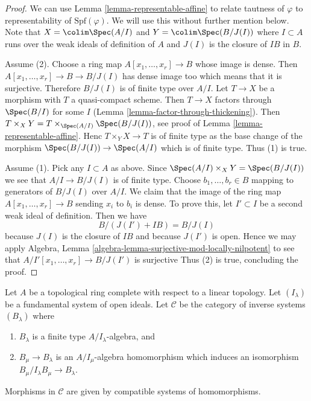 \begin{proof}
We can use Lemma \ref{lemma-representable-affine}
to relate tautness of $\varphi$ to representability of
$\text{Spf}(\varphi)$. We will use this without further mention below.
Note that $X = \colim \Spec(A/I)$ and $Y = \colim \Spec(B/J(I))$
where $I \subset A$ runs over the weak ideals of definition of $A$
and $J(I)$ is the closure of $IB$ in $B$.

\medskip\noindent
Assume (2).
Choose a ring map $A[x_1, \ldots, x_r] \to B$ whose image is dense.
Then $A[x_1, \ldots, x_r] \to B \to B/J(I)$ has dense image too
which means that it is surjective. Therefore $B/J(I)$ is of
finite type over $A/I$. Let $T \to X$ be a morphism with
$T$ a quasi-compact scheme. Then $T \to X$ factors through
$\Spec(B/I)$ for some $I$ (Lemma \ref{lemma-factor-through-thickening}).
Then $T \times_X Y = T \times_{\Spec(A/I)} \Spec(B/J(I))$, see proof of
Lemma \ref{lemma-representable-affine}.
Henc $T \times_Y X \to T$ is of finite type as the base change of
the morphism $\Spec(B/J(I)) \to \Spec(A/I)$ which is of finite
type. Thus (1) is true.

\medskip\noindent
Assume (1). Pick any $I \subset A$ as above. Since
$\Spec(A/I) \times_X Y = \Spec(B/J(I))$ we see that $A/I \to B/J(I)$
is of finite type. Choose $b_1, \ldots, b_r \in B$
mapping to generators of $B/J(I)$ over $A/I$. We claim that the image
of the ring map $A[x_1, \ldots, x_r] \to B$ sending $x_i$ to $b_i$
is dense. To prove this, let $I' \subset I$ be a second weak ideal
of definition. Then we have
$$
B/(J(I') + IB) = B/J(I)
$$
because $J(I)$ is the closure of $IB$ and because $J(I')$ is open.
Hence we may apply Algebra, Lemma
\ref{algebra-lemma-surjective-mod-locally-nilpotent}
to see that $A/I'[x_1, \ldots, x_r] \to B/J(I')$ is surjective
Thus (2) is true, concluding the proof.
\end{proof}

\noindent
Let $A$ be a topological ring complete with respect to a linear
topology. Let $(I_\lambda)$ be a fundamental system of open ideals.
Let $\mathcal{C}$ be the category of inverse systems $(B_\lambda)$ where
\begin{enumerate}
\item $B_\lambda$ is a finite type $A/I_\lambda$-algebra, and
\item $B_\mu \to B_\lambda$ is an $A/I_\mu$-algebra homomorphism
which induces an isomorphism $B_\mu/I_\lambda B_\mu \to B_\lambda$.
\end{enumerate}
Morphisms in $\mathcal{C}$ are given by compatible systems of homomorphisms.

